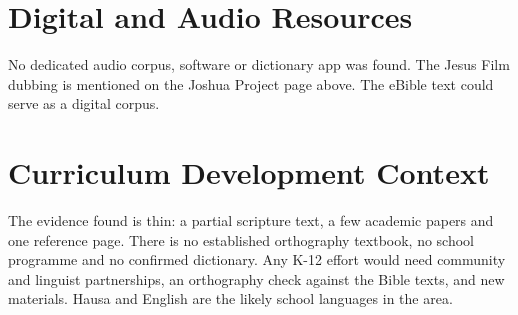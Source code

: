 \documentclass[12pt]{article}
\begin{document}
\section{Digital and Audio Resources}
No dedicated audio corpus, software or dictionary app was found. The Jesus Film dubbing is mentioned on the Joshua Project page above. The eBible text could serve as a digital corpus.

\section{Curriculum Development Context}
The evidence found is thin: a partial scripture text, a few academic papers and one reference page. There is no established orthography textbook, no school programme and no confirmed dictionary. Any K-12 effort would need community and linguist partnerships, an orthography check against the Bible texts, and new materials. Hausa and English are the likely school languages in the area.
\end{document}
